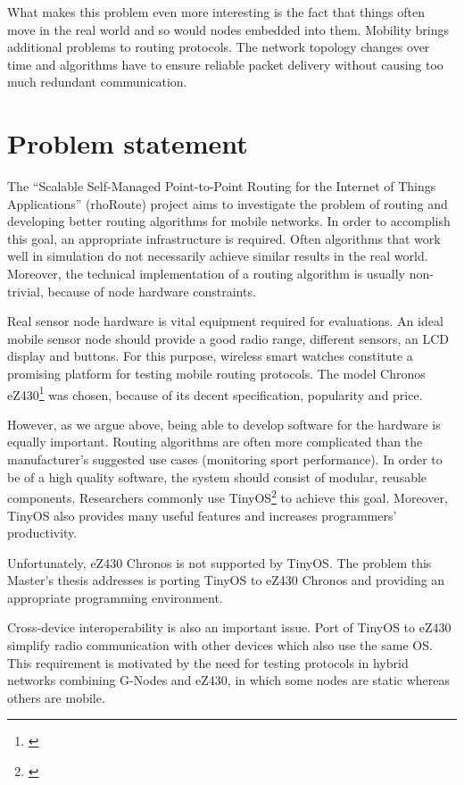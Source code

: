 What makes this problem even more interesting is the fact that things often move in the real world and so would nodes embedded into them.
Mobility brings additional problems to routing protocols.
The network topology changes over time and algorithms have to ensure reliable packet delivery without causing too much redundant communication.


\section{Problem statement}
The ``Scalable Self-Managed Point-to-Point Routing for the Internet of Things Applications'' (rhoRoute) project aims to investigate the problem of routing and developing better routing algorithms for mobile networks.
In order to accomplish this goal, an appropriate infrastructure is required.
Often algorithms that work well in simulation do not necessarily achieve similar results in the real world.
Moreover, the technical implementation of a routing algorithm is usually non-trivial, because of node hardware constraints.

Real sensor node hardware is vital equipment required for evaluations.
An ideal mobile sensor node should provide a good radio range, different sensors, an LCD display and buttons.
For this purpose, wireless smart watches constitute a promising platform for testing mobile routing protocols.
The model Chronos eZ430\footnote{\cite{eZ430Chronos}} was chosen, because of its decent specification, popularity and price.

However, as we argue above, being able to develop software for the hardware is equally important.
Routing algorithms are often more complicated than the manufacturer's suggested use cases (monitoring sport performance). 
In order to be of a high quality software, the system should consist of modular, reusable components.
Researchers commonly use TinyOS\footnote{\cite{TinyOS}} to achieve this goal.
Moreover, TinyOS also provides many useful features and increases programmers' productivity.

Unfortunately, eZ430 Chronos is not supported by TinyOS.
The problem this Master's thesis addresses is porting TinyOS to eZ430 Chronos and providing an appropriate programming environment. 

Cross-device interoperability is also an important issue.
Port of TinyOS to eZ430 simplify radio communication with other devices which also use the same OS.
This requirement is motivated by the need for testing protocols in hybrid networks combining G-Nodes and eZ430, in which some nodes are static whereas others are mobile.

